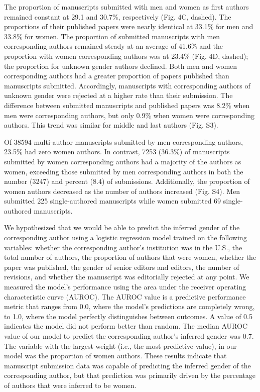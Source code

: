 \documentclass[11pt,]{article}
\begin{document}
The proportion of manuscripts submitted with men and women as first
authors remained constant at 29.1 and 30.7\%, respectively (Fig. 4C,
dashed). The proportions of their published papers were nearly identical
at 33.1\% for men and 33.8\% for women. The proportion of submitted
manuscripts with men corresponding authors remained steady at an average
of 41.6\% and the proportion with women corresponding authors was at
23.4\% (Fig. 4D, dashed); the proportion for unknown gender authors
declined. Both men and women corresponding authors had a greater
proportion of papers published than manuscripts submitted. Accordingly,
manuscripts with corresponding authors of unknown gender were rejected
at a higher rate than their submission. The difference between submitted
manuscripts and published papers was 8.2\% when men were corresponding
authors, but only 0.9\% when women were corresponding authors. This
trend was similar for middle and last authors (Fig. S3).

Of 38594 multi-author manuscripts submitted by men corresponding
authors, 23.5\% had zero women authors. In contrast, 7253 (36.3\%) of
manuscripts submitted by women corresponding authors had a majority of
the authors as women, exceeding those submitted by men corresponding
authors in both the number (3247) and percent (8.4) of submissions.
Additionally, the proportion of women authors decreased as the number of
authors increased (Fig. S4). Men submitted 225 single-authored
manuscripts while women submitted 69 single-authored manuscripts.

We hypothesized that we would be able to predict the inferred gender of
the corresponding author using a logistic regression model trained on
the following variables: whether the corresponding author's institution
was in the U.S., the total number of authors, the proportion of authors
that were women, whether the paper was published, the gender of senior
editors and editors, the number of revisions, and whether the manuscript
was editorially rejected at any point. We measured the model's
performance using the area under the receiver operating characteristic
curve (AUROC). The AUROC value is a predictive performance metric that
ranges from 0.0, where the model's predictions are completely wrong, to
1.0, where the model perfectly distinguishes between outcomes. A value
of 0.5 indicates the model did not perform better than random. The
median AUROC value of our model to predict the corresponding author's
inferred gender was 0.7. The variable with the largest weight (i.e., the
most predictive value), in our model was the proportion of women
authors. These results indicate that manuscript submission data was
capable of predicting the inferred gender of the corresponding author,
but that prediction was primarily driven by the percentage of authors
that were inferred to be women.
\end{document}
